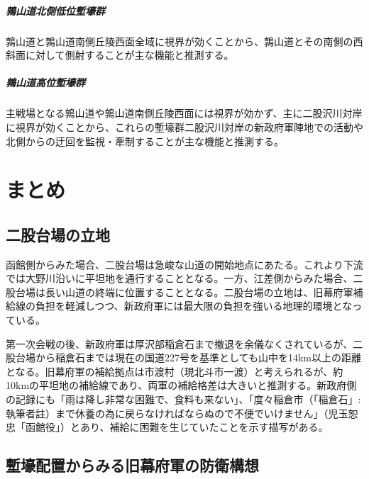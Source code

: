 \documentclass[11pt,report]{jsarticle}
\begin{document}
\subparagraph{鶉山道北側低位塹壕群}
鶉山道と鶉山道南側丘陵西面全域に視界が効くことから、鶉山道とその南側の西斜面に対して側射することが主な機能と推測する。

\subparagraph{鶉山道高位塹壕群}
主戦場となる鶉山道や鶉山道南側丘陵西面には視界が効かず、主に二股沢川対岸に視界が効くことから、これらの塹壕群二股沢川対岸の新政府軍陣地での活動や北側からの迂回を監視・牽制することが主な機能と推測する。

\section{まとめ}
\subsection{二股台場の立地}
函館側からみた場合、二股台場は急峻な山道の開始地点にあたる。これより下流では大野川沿いに平坦地を通行することとなる。一方、江差側からみた場合、二股台場は長い山道の終端に位置することとなる。二股台場の立地は、旧幕府軍補給線の負担を軽減しつつ、新政府軍には最大限の負担を強いる地理的環境となっている。

第一次会戦の後、新政府軍は厚沢部稲倉石まで撤退を余儀なくされているが、二股台場から稲倉石までは現在の国道227号を基準としても山中を14km以上の距離となる。旧幕府軍の補給拠点は市渡村（現北斗市一渡）と考えられるが、約10kmの平坦地の補給線であり、両軍の補給格差は大きいと推測する。新政府側の記録にも「雨は降し非常な困難で、食料も来ない」、「度々稲倉市（「稲倉石」:執筆者註）まで休養の為に戻らなければならぬので不便でいけません」（児玉恕忠「函館役」）とあり、補給に困難を生じていたことを示す描写がある。

\subsection{塹壕配置からみる旧幕府軍の防衛構想}
\end{document}
